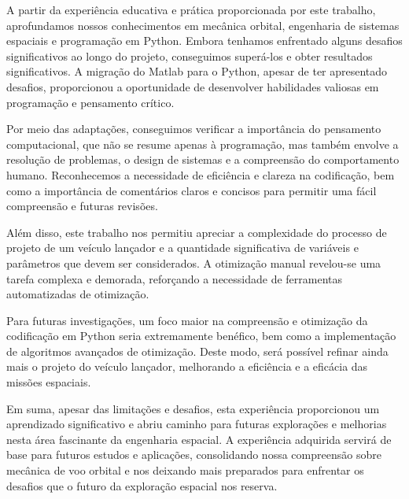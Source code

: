 A partir da experiência educativa e prática proporcionada por este trabalho, aprofundamos nossos conhecimentos em mecânica orbital, engenharia de sistemas espaciais e programação em Python. Embora tenhamos enfrentado alguns desafios significativos ao longo do projeto, conseguimos superá-los e obter resultados significativos. A migração do Matlab para o Python, apesar de ter apresentado desafios, proporcionou a oportunidade de desenvolver habilidades valiosas em programação e pensamento crítico.

Por meio das adaptações, conseguimos verificar a importância do pensamento computacional, que não se resume apenas à programação, mas também envolve a resolução de problemas, o design de sistemas e a compreensão do comportamento humano. Reconhecemos a necessidade de eficiência e clareza na codificação, bem como a importância de comentários claros e concisos para permitir uma fácil compreensão e futuras revisões.

Além disso, este trabalho nos permitiu apreciar a complexidade do processo de projeto de um veículo lançador e a quantidade significativa de variáveis e parâmetros que devem ser considerados. A otimização manual revelou-se uma tarefa complexa e demorada, reforçando a necessidade de ferramentas automatizadas de otimização.

Para futuras investigações, um foco maior na compreensão e otimização da codificação em Python seria extremamente benéfico, bem como a implementação de algoritmos avançados de otimização. Deste modo, será possível refinar ainda mais o projeto do veículo lançador, melhorando a eficiência e a eficácia das missões espaciais.

Em suma, apesar das limitações e desafios, esta experiência proporcionou um aprendizado significativo e abriu caminho para futuras explorações e melhorias nesta área fascinante da engenharia espacial. A experiência adquirida servirá de base para futuros estudos e aplicações, consolidando nossa compreensão sobre mecânica de voo orbital e nos deixando mais preparados para enfrentar os desafios que o futuro da exploração espacial nos reserva.
